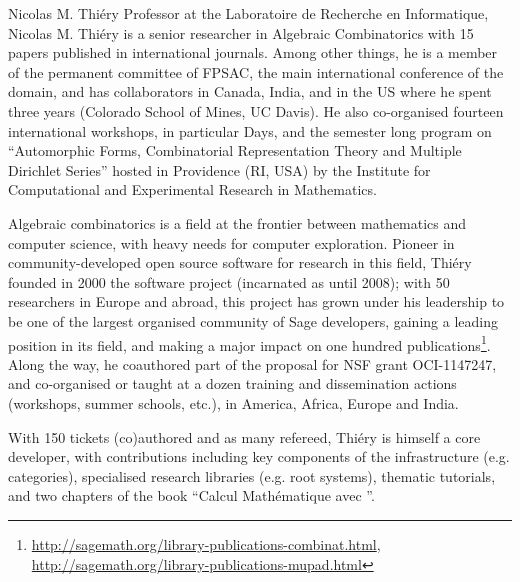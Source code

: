 \begin{participant}[type=PI,PM=12,gender=male]{Nicolas M. Thiéry}
  Professor at the Laboratoire de Recherche en Informatique, Nicolas M. Thiéry is a senior
  researcher in Algebraic Combinatorics with 15 papers published in international
  journals. Among other things, he is a member of the permanent committee of FPSAC, the
  main international conference of the domain, and has collaborators in Canada, India, and
  in the US where he spent three years (Colorado School of Mines, UC Davis). He also
  co-organised fourteen international workshops, in particular \Sage Days, and the semester
  long program on ``Automorphic Forms, Combinatorial Representation Theory and Multiple
  Dirichlet Series'' hosted in Providence (RI, USA) by the Institute for Computational and
  Experimental Research in Mathematics.

  Algebraic combinatorics is a field at the frontier between mathematics and computer
  science, with heavy needs for computer exploration. Pioneer in community-developed open
  source software for research in this field, Thiéry founded in 2000 the \SageCombinat
  software project (incarnated as \MuPADCombinat until 2008); with 50 researchers 
  in Europe and abroad, this project has grown under
  his leadership to be one of the largest organised community of Sage developers, gaining
  a leading position in its field, and making a major impact on one hundred
  publications\footnote{\url{http://sagemath.org/library-publications-combinat.html},
    \url{http://sagemath.org/library-publications-mupad.html}}. Along the way,
  he coauthored part of the proposal for NSF \SageCombinat grant
  OCI-1147247, and co-organised or taught at a dozen training and
  dissemination actions (workshops, summer schools, etc.), in
  America, Africa, Europe and India.

  With 150 tickets (co)authored and as many refereed, Thiéry is himself a core \Sage
  developer, with contributions including key components of the \Sage infrastructure
  (e.g. categories), specialised research libraries (e.g. root systems), thematic
  tutorials, and two chapters of the book ``Calcul Mathématique avec \Sage''.
\end{participant}
